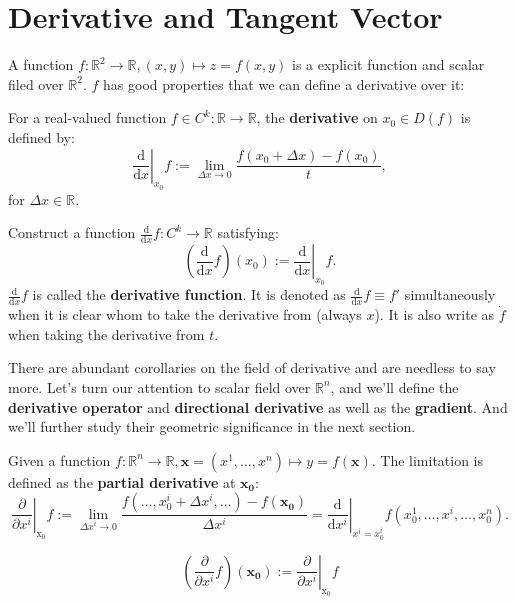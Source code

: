 \section{Derivative and Tangent Vector}

A function $f: \mathbb{R}^2\to\mathbb{R}, (x,y)\mapsto z=f(x,y)$ is a explicit function and scalar filed over $\mathbb{R}^2$.
$f$ has good properties that we can define a derivative over it:

\begin{definition}
	For a real-valued function $f\in C^{k}: \mathbb{R}\to\mathbb{R}$, the \textbf{derivative} on $x_0\in D(f)$ is defined by:
	\[
		\left.\frac{\mathrm{d}}{\mathrm{d}x}\right|_{x_0} f :=
		\lim_{\Delta x\to 0}\frac{f(x_0+\Delta x)-f(x_0)}{t},
	\]
	for $\Delta x\in\mathbb{R}$.
\end{definition}

\begin{definition}
	Construct a function $\frac{\mathrm{d}}{\mathrm{d}x}f: C^{k}\to\mathbb{R}$ satisfying:
	\[
		\left(\frac{\mathrm{d}}{\mathrm{d}x}f\right)(x_0) :=
		\left.\frac{\mathrm{d}}{\mathrm{d}x}\right|_{x_0} f.
	\]
	$\frac{\mathrm{d}}{\mathrm{d}x}f$ is called the \textbf{derivative function}.
	It is denoted as $\frac{\mathrm{d}}{\mathrm{d}x}f\equiv f'$ simultaneously when it is clear whom to take the derivative from (always $x$).
	It is also write as $\dot{f}$ when taking the derivative from $t$.
\end{definition}

There are abundant corollaries on the field of derivative and are needless to say more. Let's turn our attention to
scalar field over $\mathbb{R}^n$, and we'll define the \textbf{derivative operator} and \textbf{directional derivative}
as well as the \textbf{gradient}. And we'll further study their geometric significance in the next section.

\begin{definition} 
	Given a function $f: \mathbb{R}^n\to\mathbb{R}, \bm{x}=(x^1,\dots,x^n)\mapsto y=f(\bm{x})$. The limitation is defined as the \textbf{partial derivative} at $\bm{x_0}$:
	\[
		\left.\frac{\partial}{\partial x^i}\right|_{\mathrm{x_0}} f:=
		\lim_{\Delta x^i\to 0}\frac{f(\dots,x_0^i+\Delta x^i,\dots)-f(\bm{x_0})}{\Delta x^i}=
		\left.\frac{\mathrm{d}}{\mathrm{d}x^i}\right|_{x^i=x_0^i} f(x_0^1,\dots,x^i,\dots,x_0^n).
	\]
\end{definition}

\begin{definition}
	\[
		\left(\frac{\partial}{\partial x^i}f\right)(\bm{x_0}):=
		\left.\frac{\partial}{\partial x^i}\right|_{\mathrm{x_0}} f
	\]
\end{definition}

